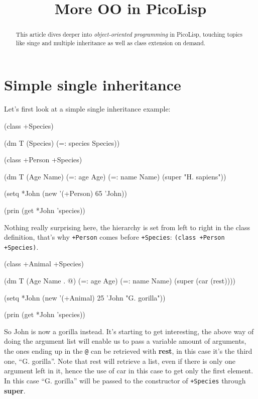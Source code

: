 \title{More OO in PicoLisp}

\maketitle


\begin{abstract}
  This article dives deeper into \emph{object-oriented programming} in
  PicoLisp, touching topics like singe and multiple inheritance as
  well as class extension on demand.
\end{abstract}

\section{Simple single inheritance}
\label{sec:more-oo}

Let's first look at a simple single inheritance example:

\begin{wideverbatim}
(class +Species)

(dm T (Species)
    (=: species Species))

(class +Person +Species)

(dm T (Age Name)
    (=: age Age)
    (=: name Name)
    (super "H. sapiens"))

(setq *John (new '(+Person) 65 'John))

(prin (get *John 'species))
\end{wideverbatim}

Nothing really surprising here, the hierarchy is set from left to
right in the class definition, that's why \texttt{+Person} comes
before \texttt{+Species}: \texttt{(class +Person +Species)}.

\begin{wideverbatim}
(class +Animal +Species)

(dm T (Age Name . @)
    (=: age Age)
    (=: name Name)
    (super (car (rest))))

(setq *John (new '(+Animal) 25 'John "G. gorilla"))

(prin (get *John 'species))
\end{wideverbatim}

So John is now a gorilla instead. It's starting to get interesting,
the above way of doing the argument list will enable us to pass a
variable amount of arguments, the ones ending up in the \texttt{@} can
be retrieved with \textbf{rest}, in this case it's the third one, ``G.
gorilla''. Note that rest will retrieve a list, even if there is only
one argument left in it, hence the use of car in this case to get only
the first element. In this case ``G. gorilla'' will be passed to the
constructor of \texttt{+Species} through \textbf{super}.

